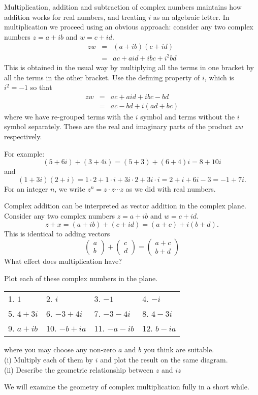 \documentclass[11pt,dvipsnames]{book}
\numberwithin{figure}{section} %
\numberwithin{table}{section} %
\begin{document}
Multiplication, addition and subtraction of complex numbers maintains how addition works for real numbers, and treating \(i\) as an algebraic letter. In multiplication we proceed using an obvious approach:
consider any two complex numbers $z=a+i b$ and $w=c+i d$.
\begin{eqnarray*}
zw&=&(a+i b)(c+i d)\\
&=&ac+ai d+i
bc+i^2bd
\end{eqnarray*}
This is obtained in the usual way by multiplying all the
terms in one bracket by all the terms in the other
bracket. Use the defining property of \(i\), which is
$i^2=-1$ so that
\begin{eqnarray*}
zw&=&ac+ai d+i bc-bd\\
&=&ac-bd+i(ad+bc)
\end{eqnarray*}
where we have re-grouped terms with the  $i$ symbol and terms
without the $i$ symbol separately. These are the real and imaginary parts of the product $zw$ respectively.

For example:
\[
(5+6i) + (3+4i)=(5+3)+(6+4)i= 8+10i\]
and
\[
(1+3i)(2+i)=1\cdot 2 + 1\cdot i + 3i\cdot 2 + 3i\cdot i = 2+i+6i-3=-1+7i.
\]
For an integer $n$, we write  $z^{n}=z\cdot z\cdots z$ as we did with real numbers.

Complex addition can be interpreted as vector addition in the complex plane.
Consider any two complex numbers $z=a+i b$ and $w=c+i d$.
\[ z+x=(a+ib)+(c+id)=(a+c)+i(b+d).\]
This is identical to adding vectors
\[ \begin{pmatrix} a \\ b \end{pmatrix} + \begin{pmatrix} c \\ d \end{pmatrix}
= \begin{pmatrix} a+c \\ b+d \end{pmatrix} \]
What effect does multiplication have?

\begin{example}
Plot each of these complex numbers in the plane.
\begin{center}
\begin{tabular}{llll}
1. $1$    & 2. $i$     & 3. $-1$    & 4.  $-i$ \\
5. $4+3i$ & 6. $-3+4i$ & 7. $-3-4i$ & 8. $4-3i$\\
9. $a+ib$ & 10. $-b+ia$ & 11. $-a-ib$ & 12. $b-ia$
\end{tabular}
\end{center}
where you may choose any non-zero $a$ and $b$ you think are suitable.\\
(i) Multiply each of them by $i$ and plot the result on the same diagram.\\
(ii) Describe the geometric relationship between $z$ and $iz$
\end{example}
We will examine the geometry of complex multiplication fully in a short while.
\end{document}
